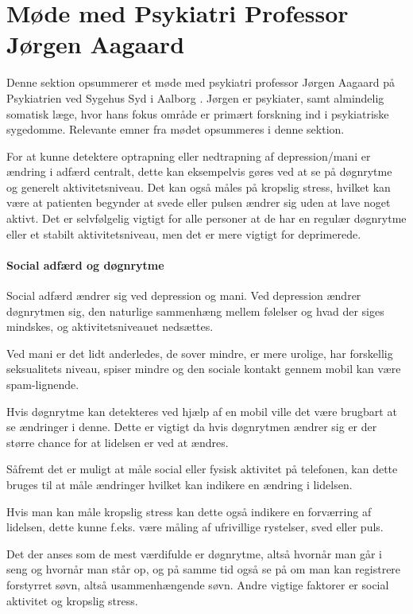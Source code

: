 \section{Møde med Psykiatri Professor Jørgen Aagaard}\label{sec:moede-med-joergen}
Denne sektion opsummerer et møde med psykiatri professor Jørgen Aagaard på Psykiatrien ved Sygehus Syd i Aalborg \citep{misc:jorgen-aagaard}. 
Jørgen er psykiater, samt almindelig somatisk læge, hvor hans fokus område er primært forskning ind i psykiatriske sygedomme.
Relevante emner fra mødet opsummeres i denne sektion.

For at kunne detektere optrapning eller nedtrapning af depression/mani er ændring i adfærd centralt, dette kan eksempelvis gøres ved at se på døgnrytme og generelt aktivitetsniveau. 
Det kan også måles på kropslig stress, hvilket kan være at patienten begynder at svede eller pulsen ændrer sig uden at lave noget aktivt. 
Det er selvfølgelig vigtigt for alle personer at de har en regulær døgnrytme eller et stabilt aktivitetsniveau, men det er mere vigtigt for deprimerede.

\paragraph{Social adfærd og døgnrytme}
Social adfærd ændrer sig ved depression og mani.
Ved depression ændrer døgnrytmen sig, den naturlige sammenhæng mellem følelser og hvad der siges mindskes, og aktivitetsniveauet nedsættes.

Ved mani er det lidt anderledes, de sover mindre, er mere urolige, har forskellig seksualitets niveau, spiser mindre og den sociale kontakt gennem mobil kan være spam-lignende. 

Hvis døgnrytme kan detekteres ved hjælp af en mobil ville det være brugbart at se ændringer i denne.
Dette er vigtigt da hvis døgnrytmen ændrer sig er der større chance for at lidelsen er ved at ændres.

Såfremt det er muligt at måle social eller fysisk aktivitet på telefonen, kan dette bruges til at måle ændringer hvilket kan indikere en ændring i lidelsen.

Hvis man kan måle kropslig stress kan dette også indikere en forværring af lidelsen, dette kunne f.eks. være måling af ufrivillige rystelser, sved eller puls. 

Det der anses som de mest værdifulde er døgnrytme, altså hvornår man går i seng og hvornår man står op, og på samme tid også se på om man kan registrere forstyrret søvn, altså usammenhængende søvn. 
Andre vigtige faktorer er social aktivitet og kropslig stress.

